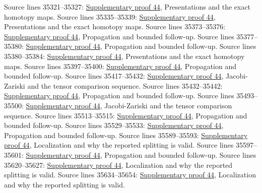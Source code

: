 \begin{AlgebraSourceRoutes}
 Source lines 35321--35327: \hyperlink{algebra_naive_cotangent_notes_20260928}{Supplementary proof 44}, Presentations and the exact homotopy maps.
 Source lines 35335--35339: \hyperlink{algebra_naive_cotangent_notes_20260928}{Supplementary proof 44}, Presentations and the exact homotopy maps.
 Source lines 35373--35376: \hyperlink{algebra_naive_cotangent_notes_20260928}{Supplementary proof 44}, Propagation and bounded follow-up.
 Source lines 35377--35380: \hyperlink{algebra_naive_cotangent_notes_20260928}{Supplementary proof 44}, Propagation and bounded follow-up.
 Source lines 35380--35384: \hyperlink{algebra_naive_cotangent_notes_20260928}{Supplementary proof 44}, Presentations and the exact homotopy maps.
 Source lines 35397--35400: \hyperlink{algebra_naive_cotangent_notes_20260928}{Supplementary proof 44}, Propagation and bounded follow-up.
 Source lines 35417--35432: \hyperlink{algebra_naive_cotangent_notes_20260928}{Supplementary proof 44}, Jacobi-Zariski and the tensor comparison sequence.
 Source lines 35432--35442: \hyperlink{algebra_naive_cotangent_notes_20260928}{Supplementary proof 44}, Propagation and bounded follow-up.
 Source lines 35493--35500: \hyperlink{algebra_naive_cotangent_notes_20260928}{Supplementary proof 44}, Jacobi-Zariski and the tensor comparison sequence.
 Source lines 35513--35515: \hyperlink{algebra_naive_cotangent_notes_20260928}{Supplementary proof 44}, Propagation and bounded follow-up.
 Source lines 35529--35533: \hyperlink{algebra_naive_cotangent_notes_20260928}{Supplementary proof 44}, Propagation and bounded follow-up.
 Source lines 35589--35593: \hyperlink{algebra_naive_cotangent_notes_20260928}{Supplementary proof 44}, Localization and why the reported splitting is valid.
 Source lines 35597--35601: \hyperlink{algebra_naive_cotangent_notes_20260928}{Supplementary proof 44}, Propagation and bounded follow-up.
 Source lines 35620--35627: \hyperlink{algebra_naive_cotangent_notes_20260928}{Supplementary proof 44}, Localization and why the reported splitting is valid.
 Source lines 35634--35654: \hyperlink{algebra_naive_cotangent_notes_20260928}{Supplementary proof 44}, Localization and why the reported splitting is valid.

\end{AlgebraSourceRoutes}
